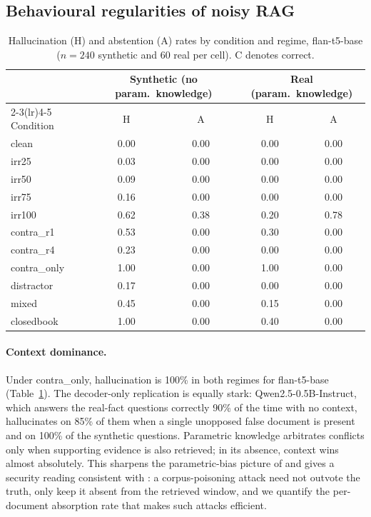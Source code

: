 \documentclass[sn-basic]{sn-jnl}
\theoremstyle{thmstyleone}
\theoremstyle{thmstyletwo}
\begin{document}
\subsection{Behavioural regularities of noisy RAG}\label{sec:phenomena}

\begin{table}[tbp]
\centering\small
\caption{Hallucination (H) and abstention (A) rates by condition and
regime, flan-t5-base ($n = 240$ synthetic and $60$ real per cell).
C denotes correct.}
\label{tab:dose}
\begin{tabular}{lcccc}
\toprule
& \multicolumn{2}{c}{Synthetic (no param.\ knowledge)} &
\multicolumn{2}{c}{Real (param.\ knowledge)} \\
\cmidrule(lr){2-3}\cmidrule(lr){4-5}
Condition & H & A & H & A \\
\midrule
clean        & 0.00 & 0.00 & 0.00 & 0.00 \\
irr25        & 0.03 & 0.00 & 0.00 & 0.00 \\
irr50        & 0.09 & 0.00 & 0.00 & 0.00 \\
irr75        & 0.16 & 0.00 & 0.00 & 0.00 \\
irr100       & 0.62 & 0.38 & 0.20 & 0.78 \\
contra\_r1   & 0.53 & 0.00 & 0.30 & 0.00 \\
contra\_r4   & 0.23 & 0.00 & 0.00 & 0.00 \\
contra\_only & 1.00 & 0.00 & 1.00 & 0.00 \\
distractor   & 0.17 & 0.00 & 0.00 & 0.00 \\
mixed        & 0.45 & 0.00 & 0.15 & 0.00 \\
closedbook   & 1.00 & 0.00 & 0.40 & 0.00 \\
\bottomrule
\end{tabular}
\end{table}



\paragraph{Context dominance.}
Under contra\_only, hallucination is 100\% in both regimes for flan-t5-base
(Table~\ref{tab:dose}). The decoder-only replication is equally stark:
Qwen2.5-0.5B-Instruct, which answers the real-fact questions correctly 90\% of
the time with no context, hallucinates on 85\% of them when a single unopposed
false document is present and on 100\% of the synthetic questions. Parametric knowledge arbitrates conflicts only when
supporting evidence is also retrieved; in its absence, context wins almost
absolutely. This sharpens the parametric-bias picture of
\citet{kortukov2024conflicts} and gives a security reading consistent with
\citet{zou2025poisonedrag}: a corpus-poisoning attack need not outvote the
truth, only keep it absent from the retrieved window, and we quantify the
per-document absorption rate that makes such attacks efficient.
\end{document}
